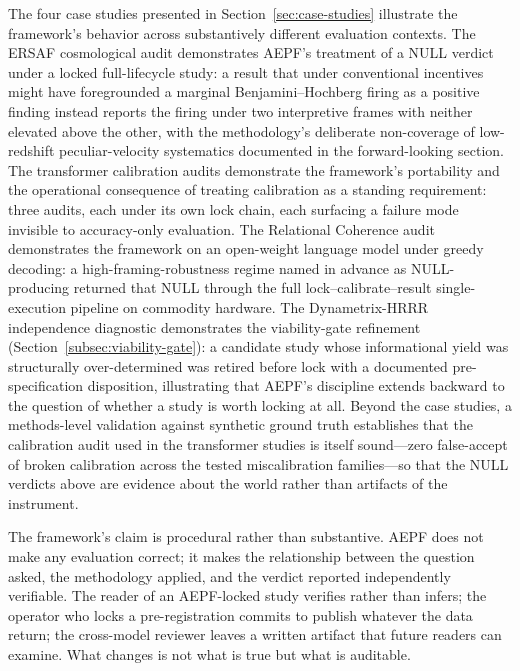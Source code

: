 \documentclass[11pt]{article}
\begin{document}
The four case studies presented in Section~\ref{sec:case-studies}
illustrate the framework's behavior across substantively different
evaluation contexts. The ERSAF cosmological audit demonstrates
AEPF's treatment of a NULL verdict under a locked full-lifecycle
study: a result that under conventional incentives might have
foregrounded a marginal Benjamini--Hochberg firing as a positive
finding instead reports the firing under two interpretive frames
with neither elevated above the other, with the methodology's
deliberate non-coverage of low-redshift peculiar-velocity
systematics documented in the forward-looking section. The
transformer calibration audits demonstrate the framework's
portability and the operational consequence of treating calibration
as a standing requirement: three audits, each under its own lock
chain, each surfacing a failure mode invisible to accuracy-only
evaluation. The Relational Coherence audit demonstrates the
framework on an open-weight language model under greedy decoding: a
high-framing-robustness regime named in advance as NULL-producing
returned that NULL through the full lock--calibrate--result
single-execution pipeline on commodity hardware. The Dynametrix-HRRR
independence diagnostic
demonstrates the viability-gate refinement
(Section~\ref{subsec:viability-gate}): a candidate study whose
informational yield was structurally over-determined was retired
before lock with a documented pre-specification disposition,
illustrating that AEPF's discipline extends backward to the
question of whether a study is worth locking at all. Beyond the case
studies, a methods-level validation against synthetic ground truth
establishes that the calibration audit used in the transformer
studies is itself sound---zero false-accept of broken calibration
across the tested miscalibration families---so that the NULL verdicts
above are evidence about the world rather than artifacts of the
instrument.

The framework's claim is procedural rather than substantive. AEPF
does not make any evaluation correct; it makes the relationship
between the question asked, the methodology applied, and the verdict
reported independently verifiable. The reader of an AEPF-locked
study verifies rather than infers; the operator who locks a
pre-registration commits to publish whatever the data return; the
cross-model reviewer leaves a written artifact that future readers
can examine. What changes is not what is true but what is
auditable.
\end{document}
